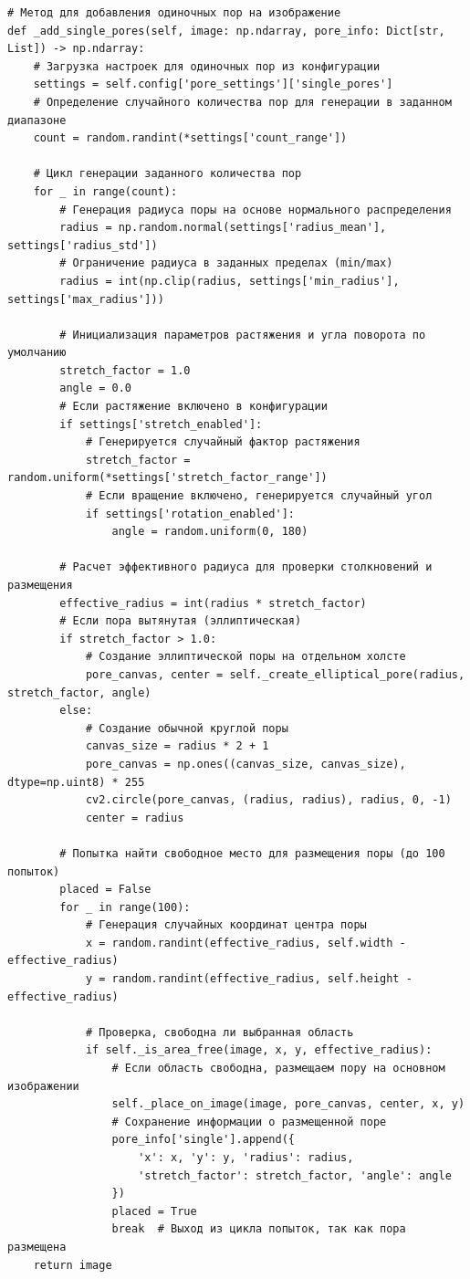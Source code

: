 \documentclass[code]{wordcore}
\begin{document}
\begin{code}
	\begin{verbatim}
# Метод для добавления одиночных пор на изображение
def _add_single_pores(self, image: np.ndarray, pore_info: Dict[str, List]) -> np.ndarray:
    # Загрузка настроек для одиночных пор из конфигурации
    settings = self.config['pore_settings']['single_pores']
    # Определение случайного количества пор для генерации в заданном диапазоне
    count = random.randint(*settings['count_range'])

    # Цикл генерации заданного количества пор
    for _ in range(count):
        # Генерация радиуса поры на основе нормального распределения
        radius = np.random.normal(settings['radius_mean'], settings['radius_std'])
        # Ограничение радиуса в заданных пределах (min/max)
        radius = int(np.clip(radius, settings['min_radius'], settings['max_radius']))

        # Инициализация параметров растяжения и угла поворота по умолчанию
        stretch_factor = 1.0
        angle = 0.0
        # Если растяжение включено в конфигурации
        if settings['stretch_enabled']:
            # Генерируется случайный фактор растяжения
            stretch_factor = random.uniform(*settings['stretch_factor_range'])
            # Если вращение включено, генерируется случайный угол
            if settings['rotation_enabled']:
                angle = random.uniform(0, 180)

        # Расчет эффективного радиуса для проверки столкновений и размещения
        effective_radius = int(radius * stretch_factor)
        # Если пора вытянутая (эллиптическая)
        if stretch_factor > 1.0:
            # Создание эллиптической поры на отдельном холсте
            pore_canvas, center = self._create_elliptical_pore(radius, stretch_factor, angle)
        else:
            # Создание обычной круглой поры
            canvas_size = radius * 2 + 1
            pore_canvas = np.ones((canvas_size, canvas_size), dtype=np.uint8) * 255
            cv2.circle(pore_canvas, (radius, radius), radius, 0, -1)
            center = radius

        # Попытка найти свободное место для размещения поры (до 100 попыток)
        placed = False
        for _ in range(100):
            # Генерация случайных координат центра поры
            x = random.randint(effective_radius, self.width - effective_radius)
            y = random.randint(effective_radius, self.height - effective_radius)

            # Проверка, свободна ли выбранная область
            if self._is_area_free(image, x, y, effective_radius):
                # Если область свободна, размещаем пору на основном изображении
                self._place_on_image(image, pore_canvas, center, x, y)
                # Сохранение информации о размещенной поре
                pore_info['single'].append({
                    'x': x, 'y': y, 'radius': radius,
                    'stretch_factor': stretch_factor, 'angle': angle
                })
                placed = True
                break  # Выход из цикла попыток, так как пора размещена
    return image


\end{verbatim}
\end{code}
\end{document}
